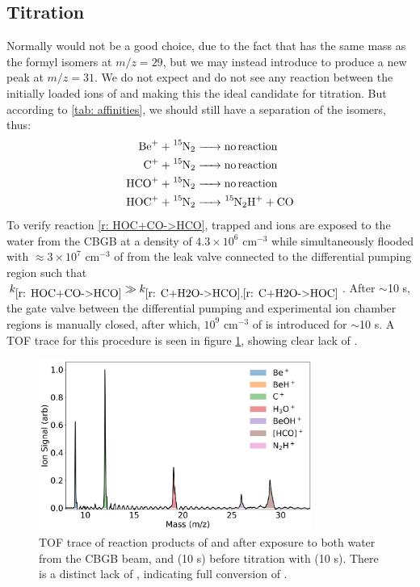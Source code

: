 \subsection{ Titration}

Normally  would not be a good choice, due to the fact that  has the same mass as the formyl isomers at $m/z=29$, but we may instead introduce  to produce a new peak at $m/z=31$. We do not expect and do not see any reaction between the initially loaded ions of  and  making this the ideal candidate for titration. But according to \cref{tab: affinities}, we should still have a separation of the isomers, thus:
\begin{align}
\ce{Be+ + ^15N2 & -> no reaction} \nonumber \\
\ce{C+ + ^15N2 & -> no reaction} \nonumber \\
\ce{HCO+ + ^15N2 & -> no reaction} \label{r: HCO+N2->NA} \\
\ce{HOC+ + ^15N2 & -> ^15N2H+ + CO} \label{r: HOC+N2->N2H}
\end{align}
To verify reaction \ref{r: HOC+CO->HCO}, trapped  and  ions are exposed to the water from the CBGB at a density of $4.3 \times 10^6$ cm$^{-3}$ while simultaneously flooded with $\approx 3 \times 10^7$ cm$^{-3}$ of  from the leak valve connected to the differential pumping region such that $k_{\ref{r: HOC+CO->HCO}} \gg k_{\ref{r: C+H2O->HCO}, \ref{r: C+H2O->HOC}}$. After $\sim$10 s, the gate valve between the differential pumping and experimental ion chamber regions is manually closed, after which, $10^9$ cm$^{-3}$ of  is introduced for $\sim$10 s. A TOF trace for this procedure is seen in figure \ref{fig: CO N2 TOF}, showing clear lack of .

\begin{figure}[H]
	\centering
	\includegraphics[width=0.8\textwidth]{images/C_H2O_CO_15N2.png}
	\caption{TOF trace of reaction products of  and  after exposure to both water from the CBGB beam, and  (10 s) before titration with  (10 s). There is a distinct lack of , indicating full conversion of .} 
	\label{fig: CO N2 TOF}
\end{figure}

